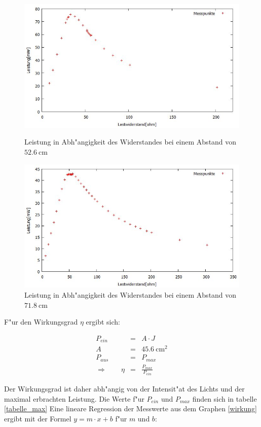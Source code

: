 \begin{figure}[htbp]
		\centering
		\includegraphics[width = 12cm]{img/526p.jpg}
		\caption{Leistung in Abh"angigkeit des Widerstandes bei einem Abstand von $\SI{52.6}{\centi\meter}$}
		\label{PR3}

		\centering
		\includegraphics[width = 12cm]{img/718p.jpg}
		\caption{Leistung in Abh"angigkeit des Widerstandes bei einem Abstand von $\SI{71.8}{\centi\meter}$}
		\label{PR4}
	\end{figure}
\newpage
	F"ur den Wirkungsgrad $\eta$ ergibt sich:

	\begin{eqnarray*}
		P_{ein} &=& A \cdot J\\
		A &=& \SI{45.6}{\centi\meter^2}\\
		P_{aus} &=& P_{max}\\
		\Rightarrow \qquad \eta &=& \frac{P_{max}}{P_{ein}} 
	\end{eqnarray*}

	Der Wirkungsgrad ist daher abh"angig von der Intensit"at des Lichts und der maximal erbrachten Leistung.
	Die Werte f"ur $P_{ein}$ und $P_{max}$ finden sich in tabelle \eqref{tabelle_max}
	Eine lineare Regression der Messwerte aus dem Graphen \eqref{wirkung} ergibt mit der Formel $y = m \cdot x+b$ f"ur $m$ und $b$:

